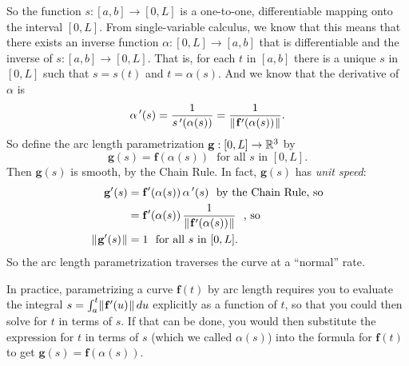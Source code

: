 So the function $s:[a,b] \rightarrow [0,L]$ is a one-to-one, differentiable mapping onto the interval $[0,L]$. From
single-variable calculus, we know that this means that there exists an inverse function $\alpha:[0,L] \rightarrow [a,b]$
that is differentiable and the inverse of $s:[a,b] \rightarrow [0,L]$. That is, for each $t$ in $[a,b]$
there is a unique $s$ in $[0,L]$ such that $s = s(t)$ and $t = \alpha(s)$. And we know that the derivative of $\alpha$
is
\begin{displaymath}
 \alpha\,'(s) = \dfrac{1}{s\,'(\alpha(s))} = \dfrac{1}{\lVert\mspace{1mu}\mathbf{f}'(\alpha(s))\mspace{1mu}\rVert}.
\end{displaymath}
So define the arc length parametrization $\mathbf{g}:[0,L] \rightarrow \mathbb{R}^{3}$ by
\begin{displaymath}
 \mathbf{g}(s) = \mathbf{f}(\alpha(s)) \text{~~for all $s$ in $[0,L]$.}
\end{displaymath}
Then $\mathbf{g}(s)$ is smooth, by the Chain Rule. 
In fact, $\mathbf{g}(s)$ has \emph{unit speed}:
\begin{align*}
 \mathbf{g}'(s) &= \mathbf{f}'(\alpha(s))\,\alpha\,'(s) \text{~~by the Chain Rule, so}\\
 &= \mathbf{f}'(\alpha(s))\,\dfrac{1}{\lVert\mspace{1mu}\mathbf{f}'(\alpha(s))\mspace{1mu}\rVert} \text{~~, so}\\
 \lVert\mspace{1mu}\mathbf{g}'(s)\mspace{1mu}\rVert &= 1 \text{~~for all $s$ in $[0,L]$.}
\end{align*}
So the arc length parametrization traverses the curve at a ``normal'' rate.

In practice, parametrizing a curve $\mathbf{f}(t)$ by arc length requires you to evaluate the integral $s = \int_{a}^{t}
\lVert\mspace{1mu}\mathbf{f}'(u)\mspace{1mu}\rVert\,du$ explicitly as a function of $t$, 
so that you could then solve for $t$ in terms of $s$. 
If that can be done, you would then substitute the expression for $t$ in terms of $s$ (which we called $\alpha(s)$)
into the formula for $\mathbf{f}(t)$ to get $\mathbf{g}(s)=\mathbf{f}(\alpha(s))$.


